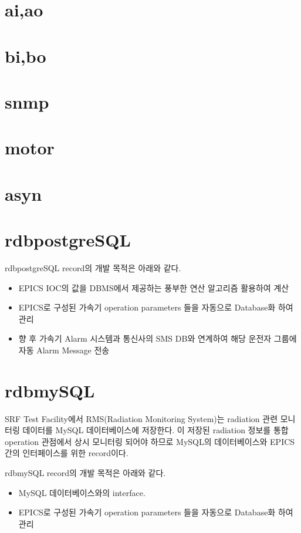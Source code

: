 \documentclass[11pt
  , a4paper
  , article
  , oneside
]{memoir}
\begin{document}
\clearpage


\chapter{ai,ao}

\chapter{bi,bo}

\chapter{snmp}

\chapter{motor}

\chapter{asyn}

\chapter{rdbpostgreSQL}

rdbpostgreSQL record의 개발 목적은 아래와 같다.
\begin{itemize}
	\item EPICS IOC의 값을 DBMS에서 제공하는 풍부한 연산 알고리즘 활용하여 계산
	\item EPICS로 구성된 가속기 operation parameters 들을 자동으로 Database화 하여 관리
	\item 향 후 가속기 Alarm 시스템과 통신사의 SMS DB와 연계하여 해당 운전자 그룹에 자동 Alarm Message 전송
\end{itemize}

\chapter{rdbmySQL}
SRF Test Facility에서 RMS(Radiation Monitoring System)는 radiation 관련 모니터링 데이터를 MySQL 데이터베이스에 저장한다. 이 저장된 radiation 정보를 통합 operation 관점에서 상시 모니터링 되어야 하므로 MySQL의 데이터베이스와 EPICS간의 인터페이스를 위한 record이다.

rdbmySQL record의 개발 목적은 아래와 같다.
\begin{itemize}
	\item MySQL 데이터베이스와의 interface.
	\item EPICS로 구성된 가속기 operation parameters 들을 자동으로 Database화 하여 관리
\end{itemize}
\end{document}
